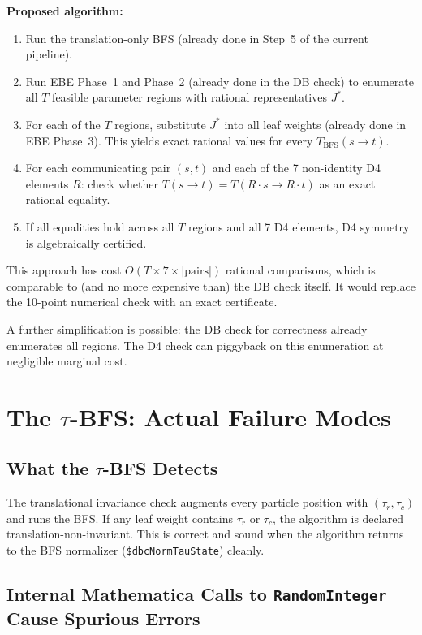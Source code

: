 \documentclass[12pt,a4paper]{article}
\theoremstyle{critical}
\theoremstyle{remark}
\begin{document}
\textbf{Proposed algorithm:}
\begin{enumerate}
\item Run the translation-only BFS (already done in Step~5 of the current pipeline).
\item Run EBE Phase~1 and Phase~2 (already done in the DB check) to enumerate all $T$
  feasible parameter regions with rational representatives $J^*$.
\item For each of the $T$ regions, substitute $J^*$ into all leaf weights
  (already done in EBE Phase~3). This yields exact rational values for every
  $T_\text{BFS}(s\to t)$.
\item For each communicating pair $(s,t)$ and each of the 7 non-identity D4 elements $R$:
  check whether $T(s\to t) = T(R\cdot s \to R\cdot t)$ as an exact rational equality.
\item If all equalities hold across all $T$ regions and all 7 D4 elements, D4 symmetry
  is algebraically certified.
\end{enumerate}

This approach has cost $O(T \times 7 \times |\text{pairs}|)$ rational comparisons,
which is comparable to (and no more expensive than) the DB check itself. It would
replace the 10-point numerical check with an exact certificate.

A further simplification is possible: the DB check for correctness already enumerates
all regions. The D4 check can piggyback on this enumeration at negligible marginal cost.

\section{The $\tau$-BFS: Actual Failure Modes}
\label{sec:taufail}

\subsection{What the $\tau$-BFS Detects}

The translational invariance check augments every particle position with
$(\tau_r, \tau_c)$ and runs the BFS. If any leaf weight contains $\tau_r$ or $\tau_c$,
the algorithm is declared translation-non-invariant. This is correct and sound when
the algorithm returns to the BFS normalizer (\texttt{\$dbcNormTauState}) cleanly.

\subsection{Internal Mathematica Calls to \texttt{RandomInteger} Cause Spurious Errors}
\label{sec:taufail:internalRNG}
\end{document}

